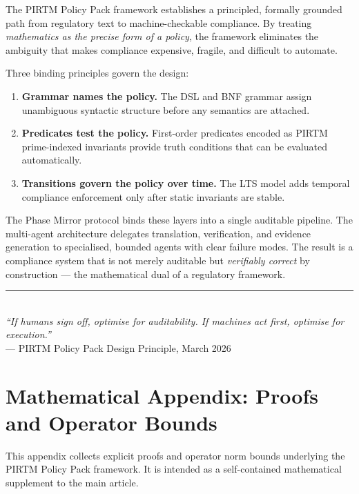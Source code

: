 \documentclass[12pt,letterpaper]{article}
\theoremstyle{definition}
\theoremstyle{plain}
\theoremstyle{remark}
\begin{document}
The PIRTM Policy Pack framework establishes a principled, formally grounded path
from regulatory text to machine-checkable compliance. By treating
\emph{mathematics as the precise form of a policy}, the framework eliminates the
ambiguity that makes compliance expensive, fragile, and difficult to automate.

Three binding principles govern the design:

\begin{enumerate}
  \item \textbf{Grammar names the policy.} The DSL and BNF grammar assign
  unambiguous syntactic structure before any semantics are attached.
  \item \textbf{Predicates test the policy.} First-order predicates encoded as
  PIRTM prime-indexed invariants provide truth conditions that can be evaluated
  automatically.
  \item \textbf{Transitions govern the policy over time.} The LTS model adds
  temporal compliance enforcement only after static invariants are stable.
\end{enumerate}

The Phase Mirror protocol binds these layers into a single auditable pipeline.
The multi-agent architecture delegates translation, verification, and evidence
generation to specialised, bounded agents with clear failure modes. The result
is a compliance system that is not merely auditable but \emph{verifiably
correct} by construction --- the mathematical dual of a regulatory framework.

\vspace{12pt}
\begin{center}
\rule{0.6\textwidth}{0.4pt} \\[4pt]
\textit{``If humans sign off, optimise for auditability. If machines act first,
optimise for execution.''} \\[2pt]
--- PIRTM Policy Pack Design Principle, March 2026
\end{center}

\section{Mathematical Appendix: Proofs and Operator Bounds}
\label{sec:math-appendix}

This appendix collects explicit proofs and operator norm bounds underlying the PIRTM Policy Pack framework. It is intended as a self-contained mathematical supplement to the main article.
\end{document}
